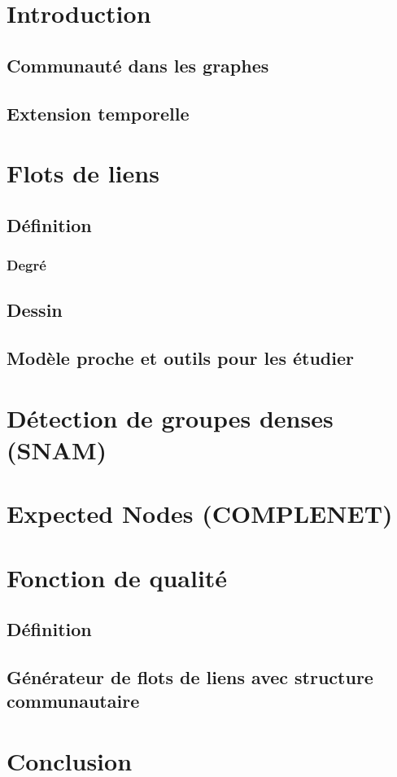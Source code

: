 \chapter{Introduction}
\section{Communauté dans les graphes}
\cite{Fortunato2010}
\section{Extension temporelle}

\chapter{Flots de liens}
\section{Définition}
\subsection{Degré}
\section{Dessin}
\section{Modèle proche et outils pour les étudier}




\chapter{Détection de groupes denses (SNAM)}

\chapter{Expected Nodes (COMPLENET)}

\chapter{Fonction de qualité}
\section{Définition}
\section{Générateur de flots de liens avec structure communautaire}

\chapter{Conclusion}
